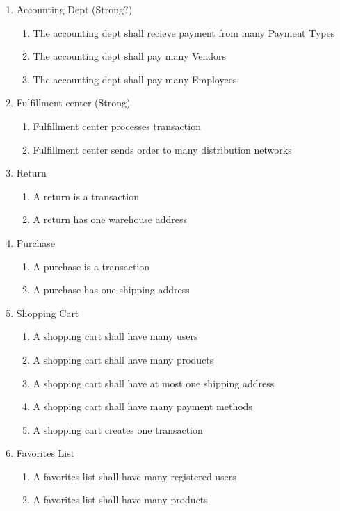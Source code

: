 \documentclass{article}
\begin{document}
\begin{enumerate}
\item Accounting Dept (Strong?)
\begin{enumerate}
	\item The accounting dept shall recieve payment from many Payment Types
	\item The accounting dept shall pay many Vendors
	\item The accounting dept shall pay many Employees
\end{enumerate}
	
\item Fulfillment center (Strong)
\begin{enumerate}
	\item Fulfillment center processes transaction
	\item Fulfillment center sends order to many distribution networks
\end{enumerate}
	
\item Return
\begin{enumerate}
	\item A return is a transaction
	\item A return has one warehouse address
\end{enumerate}

\item Purchase
\begin{enumerate}
	\item A purchase is a transaction
	\item A purchase has one shipping address
\end{enumerate}

\item Shopping Cart
\begin{enumerate}
	\item A shopping cart shall have many users
	\item A shopping cart shall have many products
	\item A shopping cart shall have at most one shipping address
	\item A shopping cart shall have many payment methods
	\item A shopping cart creates one transaction
\end{enumerate}

\item Favorites List
\begin{enumerate}
	\item A favorites list shall have many registered users
	\item A favorites list shall have many products
\end{enumerate}


\end{enumerate}
\end{document}

